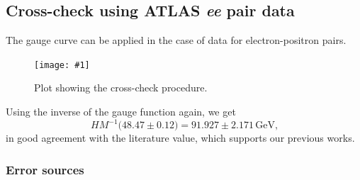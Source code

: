 \documentclass[twocolumn]{article}
\newcommand{\insertFigure}[1]{%
   \texttt{[image: \#1]}%
}
\begin{document}
\subsection{Cross-check using ATLAS \textit{ee} pair data}
The gauge curve can be applied in the case of data for electron-positron pairs. 
\begin{figure}
\centering
\insertFigure{Images/ZeeCheck.png}
\caption{Plot showing the cross-check procedure.}
\label{fig:crosscheck}
\end{figure}
Using the inverse of the gauge function again, we get
\begin{equation}
HM^{-1} \big(48.47 \pm 0.12\big) = 91.927 \pm 2.171 \, \text{GeV,}
\end{equation}
in good agreement with the literature value, which supports our previous works.
\subsubsection{Error sources}
\end{document}

